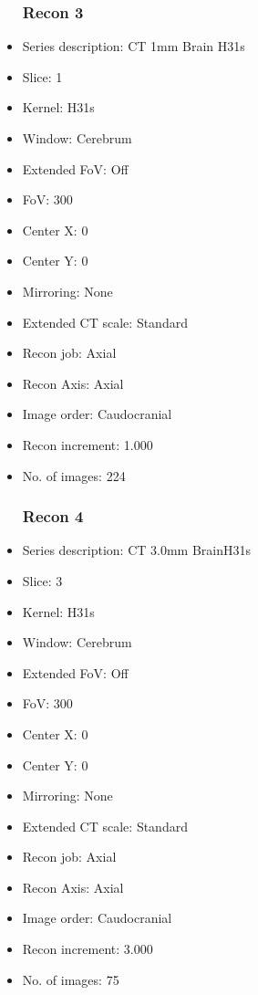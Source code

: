 \documentclass[12pt]{article}
\begin{document}
\begin{itemize}
\subsubsection{Recon 3}
\item Series description: CT 1mm Brain H31s
\item Slice: 1
\item Kernel: H31s
\item Window: Cerebrum
\item Extended FoV: Off
\item FoV: 300
\item Center X: 0
\item Center Y: 0
\item Mirroring: None
\item Extended CT scale: Standard
\item Recon job: Axial
\item Recon Axis: Axial
\item Image order: Caudocranial
\item Recon increment: 1.000
\item No. of images: 224
\subsubsection{Recon 4}
\item Series description: CT  3.0mm BrainH31s
\item Slice: 3
\item Kernel: H31s
\item Window: Cerebrum
\item Extended FoV: Off
\item FoV: 300
\item Center X: 0
\item Center Y: 0
\item Mirroring: None
\item Extended CT scale: Standard
\item Recon job: Axial
\item Recon Axis: Axial
\item Image order: Caudocranial
\item Recon increment: 3.000
\item No. of images: 75

\end{itemize}
\end{document}
